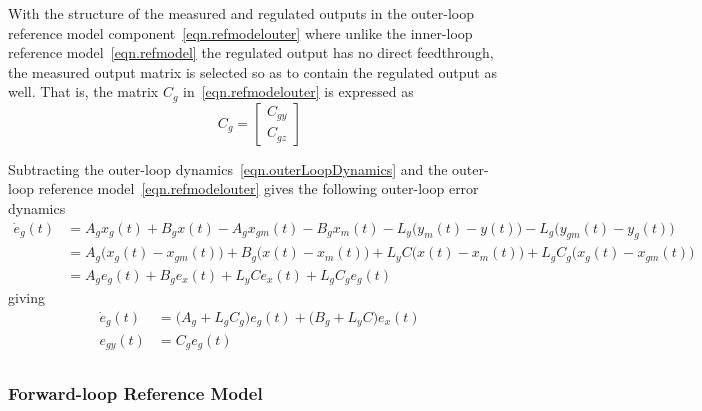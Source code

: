 \begin{rem-dan}\label{rem.ygmandzgm}
  With the structure of the measured and regulated outputs in the outer-loop reference model component\ \eqref{eqn.refmodelouter} where unlike the inner-loop reference model\ \eqref{eqn.refmodel} the regulated output has no direct feedthrough, the measured output matrix is selected so as to contain the regulated output as well.
  That is, the matrix $C_{g}$ in\ \eqref{eqn.refmodelouter} is expressed as
  \begin{equation*}
    C_{g} =
    \begin{bmatrix}
      C_{gy} \\
      C_{gz}
    \end{bmatrix}
  \end{equation*}
\end{rem-dan}

Subtracting the outer-loop dynamics\ \eqref{eqn.outerLoopDynamics} and the outer-loop reference model\ \eqref{eqn.refmodelouter} gives the following outer-loop error dynamics
\begin{equation*}
  \begin{split}
    \dot{e}_{g}(t) &=
    A_{g}x_{g}(t)
    + B_{g}x(t)
    - A_{g}x_{gm}(t)
    - B_{g}x_{m}(t)
    - L_{y}\bigr(y_{m}(t)-y(t)\bigr)
    - L_{g}\bigr(y_{gm}(t)-y_{g}(t)\bigr) \\
    &=
    A_{g}\bigr(x_{g}(t) - x_{gm}(t)\bigr)
    + B_{g}\bigr(x(t) - x_{m}(t)\bigr)
    + L_{y}C\bigr(x(t)-x_{m}(t)\bigr)
    + L_{g}C_{g}\bigr(x_{g}(t)-x_{gm}(t)\bigr) \\
    &=
    A_{g}e_{g}(t)
    + B_{g}e_{x}(t)
    + L_{y}Ce_{x}(t)
    + L_{g}C_{g}e_{g}(t)
  \end{split}
\end{equation*}
giving
\begin{equation}
  \label{eqn.outerlooperrordynamics}
  \begin{split}
    \dot{e}_{g}(t) &= \bigr(A_{g} + L_{g}C_{g}\bigr)e_{g}(t) + \bigr(B_{g} + L_{y}C\bigr)e_{x}(t) \\
    e_{gy}(t) &= C_{g}e_{g}(t) \\
  \end{split}
\end{equation}

\subsubsection{Forward-loop Reference Model}

